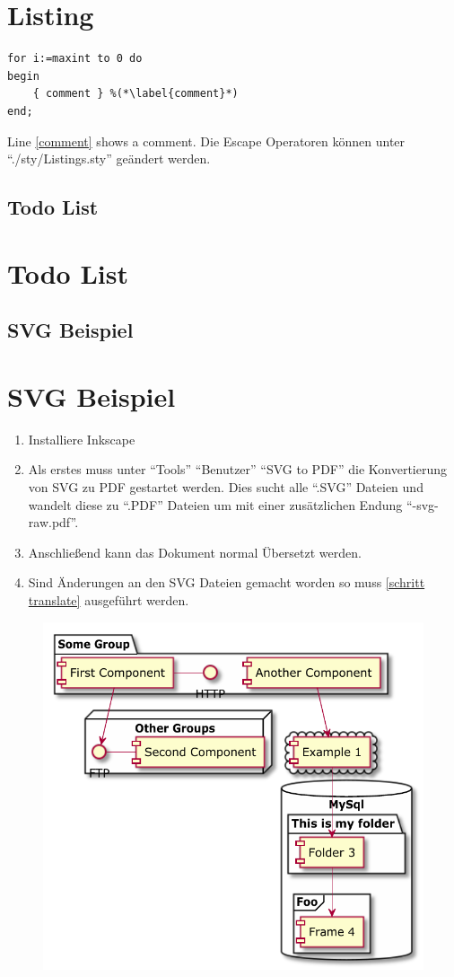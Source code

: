 \documentclass[./\jobname.tex]{subfiles}
\begin{document}
	\chapter{Listing}
\fi
%
\begin{lstlisting}[caption={example}]
for i:=maxint to 0 do
begin
	{ comment } %(*\label{comment}*)
end;
\end{lstlisting}
%
Line \ref{comment} shows a comment. Die Escape Operatoren können unter \enquote{./sty/Listings.sty} geändert werden. 
%
\if\paper\FHVmode
	\section{Todo List}
\else
	\chapter{Todo List}
\fi
%
\lipsum[1] 
\lipsum[2] 
\lipsum[3]
%
\if\paper\FHVmode
	\section{SVG Beispiel}
\else
	\chapter{SVG Beispiel}
\fi
%
\begin{enumerate}
	\item Installiere Inkscape
	\item Als erstes muss unter \enquote{Tools} \pfeil \enquote{Benutzer} \pfeil \enquote{SVG to PDF} die Konvertierung von SVG zu PDF gestartet werden. Dies sucht alle \enquote{.SVG} Dateien und wandelt diese zu \enquote{.PDF} Dateien um mit einer zusätzlichen Endung \enquote{-svg-raw.pdf}.\label{schritt translate}
	\item Anschließend kann das Dokument normal Übersetzt werden.
	\item Sind Änderungen an den SVG Dateien gemacht worden so muss \ref{schritt translate} ausgeführt werden.
\end{enumerate}
%
\begin{figure}[H]
	\centering
	\includegraphics[width=0.75\linewidth]{./img/svg/Component_Diagram-test-svg-raw.pdf}
	\label{fig: beispiel svg}
\end{figure}
%
\if\paper\FHVmode
\end{document}
